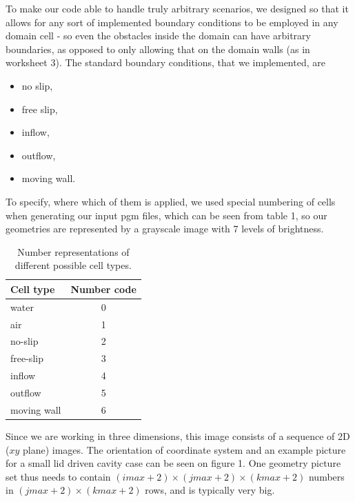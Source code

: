 \documentclass[a4paper, 12pt]{article}
\begin{document}
To make our code able to handle truly arbitrary scenarios, we designed so that it allows for any sort of implemented boundary conditions to be employed in any
domain cell - so even the obstacles inside the domain can have arbitrary boundaries, as opposed to only allowing that on the domain walls (as in worksheet 3).
The standard boundary conditions, that we implemented, are
\begin{itemize}
\item no slip,
\item free slip,
\item inflow,
\item outflow,
\item moving wall.
\end{itemize}
To specify, where which of them is applied, we used special numbering of cells when generating our input pgm files, which can be seen from table
1, so our geometries are represented by a grayscale image with 7 levels of brightness.
\begin{table}[hb!]
\centering
\label{tab1}
\begin{tabular}{|l|c|}
\hline
{\bf Cell type} & {\bf Number code}\\
\hline
water & 0 \\
air & 1 \\
no-slip & 2 \\
free-slip & 3 \\
inflow & 4 \\
outflow & 5 \\
moving wall & 6 \\
\hline
\end{tabular}
\caption{Number representations of different possible cell types.}
\end{table}
Since we are working in three dimensions, this image consists of a sequence of 2D ($xy$ plane) images. The orientation of coordinate system and an
example picture for a small lid driven cavity case can be seen on figure 1. One geometry picture set thus needs to contain
$(imax+2)\times(jmax+2)\times(kmax+2)$ numbers in $(jmax+2)\times(kmax+2)$ rows, and is typically very big.
\end{document}
